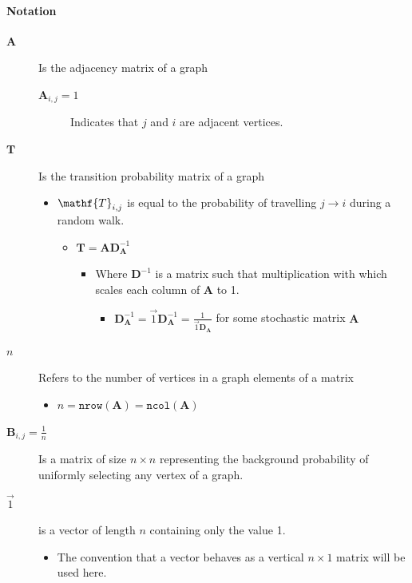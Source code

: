 \documentclass[11pt]{article}
\begin{document}
\paragraph{Notation}
\label{notation}
\begin{description}
\item[{\(\mathbf{A}\)}] Is the adjacency matrix of a graph
\begin{description}
\item[{\(\mathbf{A}_{i,j} = 1\)}] Indicates that \(j\) and \(i\) are adjacent vertices.
\end{description}
\item[{\(\mathbf{T}\)}] Is the transition probability matrix of a graph
\begin{itemize}
\item \(\mathf{T}_{i,j}\) is equal to the probability of travelling \(j \rightarrow  i\) during a random walk.
\begin{itemize}
\item \(\mathbf{T} = \mathbf{A} \mathbf{D}_{\mathbf{A}}^{-1}\)
\begin{itemize}
\item Where \(\mathbf{D}^{-1}\) is a matrix such that multiplication with which scales each column of \(\mathbf{A}\) to 1.
\begin{itemize}
\item \(\mathbf{D}^{-1}_{\mathbf{A}} = \vec{1}\mathbf{D}^{-1}_{\mathbf{A}} = \frac{1}{\vec{1}\mathbf{D}_{\mathbf{A}}}\) for some stochastic matrix \(\mathbf{A}\)
\end{itemize}
\end{itemize}
\end{itemize}
\end{itemize}
\item[{\(n\)}] Refers to the number of vertices in a graph elements of a matrix
\begin{itemize}
\item \(n = \mathtt{nrow}\left(\mathbf{A}\right) = \mathtt{ncol}\left(\mathbf{A}\right)\)
\end{itemize}
\item[{\(\mathbf{B}_{i,j} = \frac{1}{n}\)}] Is a matrix of size \(n\times n\) representing the background probability of uniformly selecting any vertex of a graph.
\item[{\(\vec{1}\)}] is a vector of length \(n\) containing only the value 1.
\begin{itemize}
\item The convention that a vector behaves as a vertical \(n \times 1\) matrix will be used here.

\end{itemize}
\end{description}
\end{document}
